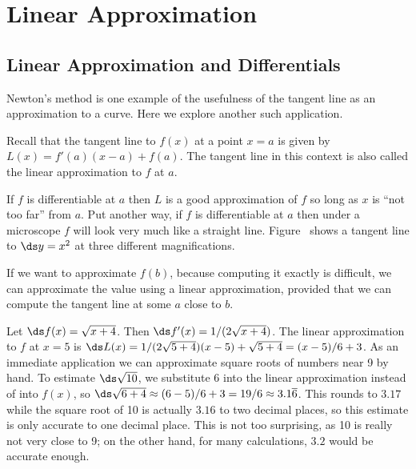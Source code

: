 \chapter{Linear Approximation}

\section{Linear Approximation and Differentials}


Newton's method is one example of the usefulness of the tangent line
as an approximation to a curve. Here we explore another such
application.

Recall that the tangent line to $f(x)$ at a point $x=a$ is given by
$L(x) = f'(a) (x-a) + f(a)$.  The tangent line in this context is also
called the {\dfont linear approximation\/}
to $f$ at $a$.

If $f$ is differentiable at $a$ then $L$ is a good approximation of
$f$ so long as $x$ is ``not too far'' from $a$.  Put another way, if
$f$ is differentiable at $a$ then under a microscope $f$ will look
very much like a straight line. Figure~ shows a tangent line to $\ds y=x^2$ at three different
magnifications. 

If we want to approximate $f(b)$,
because computing it exactly is difficult, we can approximate the
value using a linear approximation, provided that we can compute the
tangent line at some $a$ close to $b$.


\begin{example} Let $\ds f(x)=\sqrt{x+4}$. Then $\ds f'(x)=1/(2\sqrt{x+4})$.
 The linear approximation to $f$ at $x=5$ is $\ds
L(x)=1/(2\sqrt{5+4})(x-5)+\sqrt{5+4}=(x-5)/6+3$.  As an immediate
application we can approximate square roots of numbers near 9 by hand.
To estimate $\ds\sqrt{10}$, we substitute 6 into the linear
approximation instead of into $f(x)$, so
$\ds \sqrt{6+4}\approx (6-5)/6+3 = 19/6\approx 3.1\overline{6}$.
This rounds to $3.17$ while the square root of 10 is actually
$3.16$ to two decimal places, so this estimate is only accurate to one
decimal place. This is not too surprising, as 10 is really not very
close to 9; on the other hand, for many calculations, $3.2$ would be
accurate enough.
\end{example}

